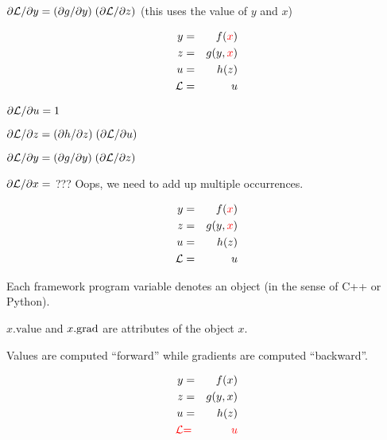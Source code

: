 {\medskip
{\color{red} ${\partial {\cal L}}/{\partial y} = ({\partial g}/{\partial y}) \; ({\partial {\cal L}}/{\partial z})$} (this uses the value of $y$ and $x$)

\vspace{-3ex}
\begin{eqnarray*}
  y & = & f({\color{red} x}) \\
  z & = & g(y,{\color{red} x}) \\
  u & = & h(z) \\
  {\cal L} &  = &  u
\end{eqnarray*}

\medskip
${\partial {\cal L}}/{\partial u} = 1$

\medskip
${\partial {\cal L}}/{\partial z} = ({\partial h}/{\partial z}) \;({\partial {\cal L}}/{\partial u})$

\medskip
${\partial {\cal L}}/{\partial y} = ({\partial g}/{\partial y}) \;({\partial {\cal L}}/{\partial z})$

\medskip
{\color{red} ${\partial {\cal L}}/{\partial x} =$ ???} Oops, we need to add up multiple occurrences.

\vspace{-3ex}
\begin{eqnarray*}
  y & = & f({\color{red} x}) \\
  z & = & g(y,{\color{red} x}) \\
  u & = & h(z) \\
  {\cal L} &  = &  u
\end{eqnarray*}

\medskip
Each framework program variable denotes an {\color{red} object} (in the sense of C++ or Python).

\medskip
{\color{red} $x.\mathrm{value}$} and {\color{red} $x.\mathrm{grad}$} are attributes of the {\color{red} object $x$}.

\bigskip
Values are computed ``forward'' while gradients are computed ``backward''.


\vspace{-3ex}
\begin{eqnarray*}
  y & = & f(x) \\
  z & = & g(y,x) \\
  u & = & h(z) \\
  {\color{red} {\cal L}} &  {\color{red} =} & {\color{red}  u}
\end{eqnarray*}


}
